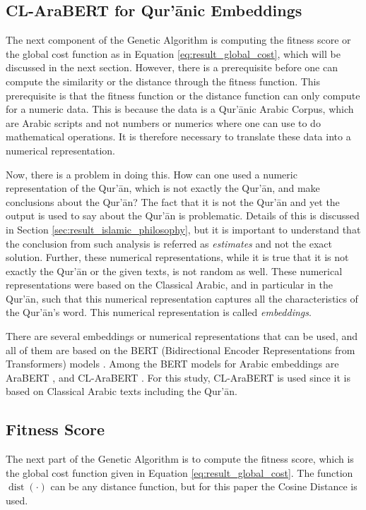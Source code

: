 \subsection{CL-AraBERT for Qur'\=anic Embeddings}
The next component of the Genetic Algorithm is computing the fitness score or the global cost function as in Equation \ref{eq:result_global_cost}, which will be discussed in the next section. However, there is a prerequisite before one can compute the similarity or the distance through the fitness function. This prerequisite is that the fitness function or the distance function can only compute for a numeric data. This is because the data is a Qur'\=anic Arabic Corpus, which are Arabic scripts and not numbers or numerics where one can use to do mathematical operations. It is therefore necessary to translate these data into a numerical representation. 

Now, there is a problem in doing this. How can one used a numeric representation of the Qur'\=an, which is not exactly the Qur'\=an, and make conclusions about the Qur'\=an? The fact that it is not the Qur'\=an and yet the output is used to say about the Qur'\=an is problematic. Details of this is discussed in Section \ref{sec:result_islamic_philosophy}, but it is important to understand that the conclusion from such analysis is referred as \textit{estimates} and not the exact solution. Further, these numerical representations, while it is true that it is not exactly the Qur'\=an or the given texts, is not random as well. These numerical representations were based on the Classical Arabic, and in particular in the Qur'\=an, such that this numerical representation captures all the characteristics of the Qur'\=an's word. This numerical representation is called \textit{embeddings}.

There are several embeddings or numerical representations that can be used, and all of them are based on the BERT (Bidirectional Encoder Representations from Transformers) models \cite{devlin2018bert}. Among the BERT models for Arabic embeddings are AraBERT \cite{mahboub2024evaluation}, and CL-AraBERT \cite{MALHAS2022103068}. For this study, CL-AraBERT is used since it is based on Classical Arabic texts including the Qur'\=an.
\subsection{Fitness Score}
The next part of the Genetic Algorithm is to compute the fitness score, which is the global cost function given in Equation \ref{eq:result_global_cost}. The function $\operatorname{dist}(\cdot)$ can be any distance function, but for this paper the Cosine Distance is used.
